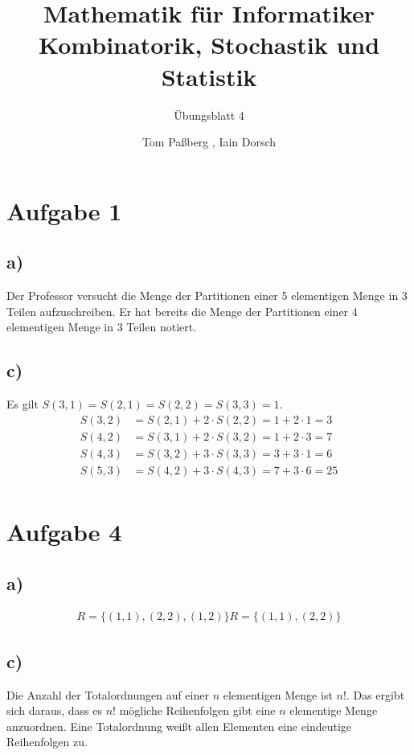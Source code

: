 \documentclass[a4paper]{scrartcl}
\title{Mathematik für Informatiker \\ Kombinatorik, Stochastik und Statistik}
\subtitle{Übungsblatt 4}
\author{Tom Paßberg , Iain Dorsch}
\date{}
\begin{document}
\maketitle

\newpage

\section*{Aufgabe 1}
\subsection*{a)}
Der Professor versucht die Menge der Partitionen einer 5 elementigen Menge in 3 Teilen aufzuschreiben.
Er hat bereits die Menge der Partitionen einer 4 elementigen Menge in 3 Teilen notiert.

\subsection*{c)}
Es gilt $ S(3,1) = S(2,1) = S(2,2) = S(3,3) = 1$.
\begin{align*}
    S(3,2) &= S(2,1) + 2 \cdot S(2,2) = 1 + 2 \cdot 1 = 3 \\
    S(4,2) &= S(3,1) + 2 \cdot S(3,2) = 1 + 2 \cdot 3 = 7 \\
    S(4,3) &= S(3,2) + 3 \cdot S(3,3) = 3 + 3 \cdot 1 = 6 \\
    S(5,3) &= S(4,2) + 3 \cdot S(4,3) = 7 + 3 \cdot 6 = 25 \\
\end{align*}

\section*{Aufgabe 4}
\subsection*{a)}
\begin{align*}
    R = \{(1,1),(2,2),(1,2)\}
    R = \{(1,1),(2,2)\}
\end{align*}

\subsection*{c)}
Die Anzahl der Totalordnungen auf einer $n$ elementigen Menge ist $n!$. Das ergibt sich daraus, dass es $n!$ mögliche 
Reihenfolgen gibt eine $n$ elementige Menge anzuordnen. Eine Totalordnung weißt allen Elementen eine eindeutige Reihenfolgen zu.
\end{document}
